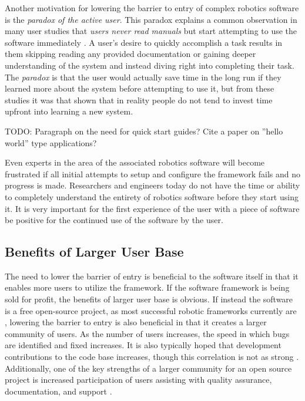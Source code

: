 \documentclass[10pt,journal,compsoc]{joser1}
\begin{document}
{Another motivation for lowering the barrier to entry of complex robotics software is the \textit{paradox of the active user}. This paradox explains a common observation in many user studies that \textit{users never read manuals} but start attempting to use the software immediately \cite{carroll1987interfacing}. A user's desire to quickly accomplish a task results in them skipping reading any provided documentation or gaining deeper understanding of the system and instead diving right into completing their task. The \textit{paradox} is that the user would actually save time in the long run if they learned more about the system before attempting to use it, but from these studies it was that shown that in reality people do not tend to invest time upfront into learning a new system.

TODO: Paragraph on the need for quick start guides? Cite a paper on ''hello world'' type applications?

Even experts in the area of the associated robotics software will become frustrated if all initial attempts to setup and configure the framework fails and no progress is made. Researchers and engineers today do not have the time or ability to completely understand the entirety of robotics software before they start using it. It is very important for the first experience of the user with a piece of software be positive for the continued use of the software by the user.

\subsection{Benefits of Larger User Base}

The need to lower the barrier of entry is beneficial to the software itself in that it enables more users to utilize the framework. If the software framework is being sold for profit, the benefits of larger user base is obvious. If instead the software is a free open-source project, as most successful robotic frameworks currently are \cite{makarenko2007benefits}, lowering the barrier to entry is also beneficial in that it creates a larger community of users. As the number of users increases, the speed in which bugs are identified and fixed increases. It is also typically hoped that development contributions to the code base increases, though this correlation is not as strong \cite{schmidt1999software}. Additionally, one of the key strengths of a larger community for an open source project is increased participation of users assisting with quality assurance, documentation, and support \cite{schmidt2001leveraging}.

}
\end{document}
